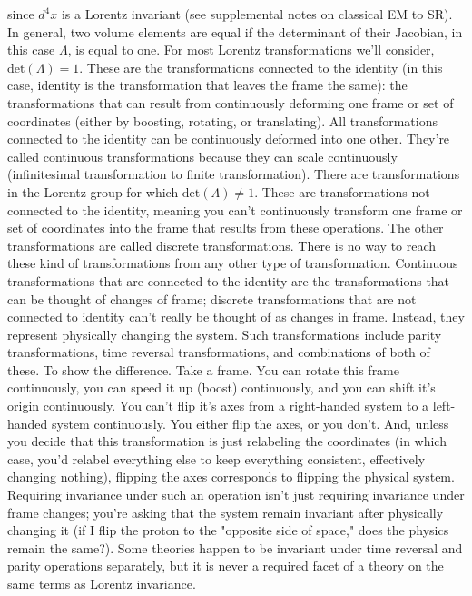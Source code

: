 since $d^4x$ is a Lorentz invariant (see supplemental notes on classical EM to SR). In general, two volume elements are equal if the determinant of their Jacobian, in this case $\Lambda$, is equal to one. For most Lorentz transformations we'll consider, $\text{det}(\Lambda)=1$. These are the transformations connected to the identity (in this case, identity is the transformation that leaves the frame the same): the transformations that can result from continuously deforming one frame or set of coordinates (either by boosting, rotating, or translating). All transformations connected to the identity can be continuously deformed into one other. They're called continuous transformations because they can scale continuously (infinitesimal transformation to finite transformation). There are transformations in the Lorentz group for which $\text{det}(\Lambda)\ne1$. These are transformations not connected to the identity, meaning you can't continuously transform one frame or set of coordinates into the frame that results from these operations.  The other transformations are called discrete transformations. There is no way to reach these kind of transformations from any other type of transformation. Continuous transformations that are connected to the identity are the transformations that can be thought of changes of frame; discrete transformations that are not connected to identity can't really be thought of as changes in frame. Instead, they represent physically changing the system. Such transformations include parity transformations, time reversal transformations, and combinations of both of these. To show the difference. Take a frame. You can rotate this frame continuously, you can speed it up (boost) continuously, and you can shift it's origin continuously. You can't flip it's axes from a right-handed system to a left-handed system continuously. You either flip the axes, or you don't. And, unless you decide that this transformation is just relabeling the coordinates (in which case, you'd relabel everything else to keep everything consistent, effectively changing nothing), flipping the axes corresponds to flipping the physical system. Requiring invariance under such an operation isn't just requiring invariance under frame changes; you're asking that the system remain invariant after physically changing it (if I flip the proton to the "opposite side of space," does the physics remain the same?). Some theories happen to be invariant under time reversal and parity operations separately, but it is never a required facet of a theory on the same terms as Lorentz invariance.


